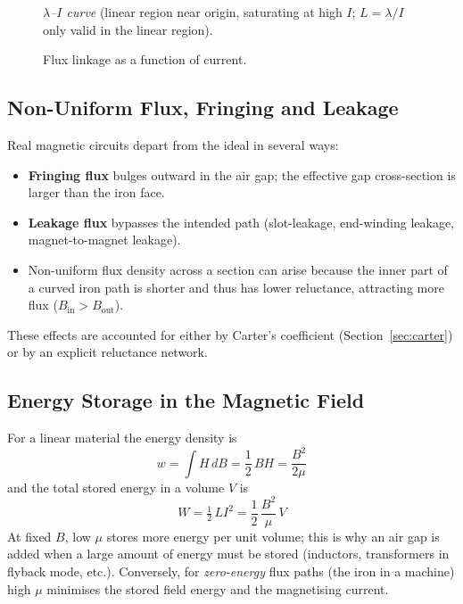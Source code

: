 \documentclass[12pt,a4paper]{article}
\begin{document}
\begin{figure}[H]
  \centering
  \textit{$\lambda$--$I$ curve} (linear region near origin, saturating at high $I$;
   $L=\lambda/I$ only valid in the linear region).
  \caption{Flux linkage as a function of current.}
  \label{fig:lambda_I}
\end{figure}

\subsection{Non-Uniform Flux, Fringing and Leakage}

Real magnetic circuits depart from the ideal in several ways:
\begin{itemize}[noitemsep]
  \item \textbf{Fringing flux} bulges outward in the air gap; the
        effective gap cross-section is larger than the iron face.
  \item \textbf{Leakage flux} bypasses the intended path (slot-leakage,
        end-winding leakage, magnet-to-magnet leakage).
  \item Non-uniform flux density across a section can arise because the
        inner part of a curved iron path is shorter and thus has lower
        reluctance, attracting more flux ($B_\text{in} > B_\text{out}$).
\end{itemize}
These effects are accounted for either by Carter's coefficient
(Section~\ref{sec:carter}) or by an explicit reluctance network.

\subsection{Energy Storage in the Magnetic Field}

For a linear material the energy density is
\begin{equation}
  w = \int H\,dB = \frac{1}{2}\,B H = \frac{B^2}{2\mu}
  \label{eq:wdensity}
\end{equation}
and the total stored energy in a volume $V$ is
\begin{equation}
  W = \tfrac{1}{2}\,L I^2
    = \frac{1}{2}\,\frac{B^2}{\mu}\,V
\end{equation}
At fixed $B$, low $\mu$ stores more energy per unit volume; this is
why an air gap is added when a large amount of energy must be stored
(inductors, transformers in flyback mode, etc.). Conversely, for
\emph{zero-energy} flux paths (the iron in a machine) high
$\mu$ minimises the stored field energy and the magnetising current.
\end{document}
